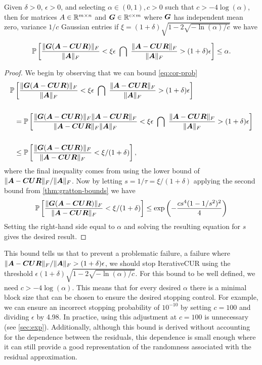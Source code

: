 \begin{corollary}
    Given  $\delta >0$, $\epsilon >0$, and selecting $\alpha\in(0,1), c>0$ such that $c>-4\log(\alpha)$, then for matrices $A \in \mathbb{R}^{m \times n}$ and $\boldsymbol{G} \in \mathbb{R}^{c \times m}$ where $\boldsymbol{G}$ has independent mean zero, variance $1 / c$ Gaussian entries if  $\xi =  (1+\delta)\sqrt{1-2\sqrt{-\ln(\alpha)/c}} $ we have 

   \begin{equation}\label{eq:cor-prob}
       \pr\left[\frac{\|\mat G(\mat A-\mat{CUR})\|_F}{\|\mat{A}\|_F} < \xi \epsilon \ \bigcap \ \frac{\|\mat A-\mat{CUR}\|_F}{\|\mat A\|_F} > (1+\delta)\epsilon \right] \leq \alpha.
   \end{equation}
\end{corollary}
\begin{proof}
We begin by observing that we can bound \cref{eq:cor-prob}
    \begin{align}
        \notag \pr&\left[\frac{\|\mat G(\mat A-\mat{CUR})\|_F}{\|\mat A\|_F} < \xi \epsilon \ \bigcap \ \frac{\|\mat A-\mat{CUR}\|_F}{\|\mat A\|_F} > (1+\delta)\epsilon \right]\\
        \notag \\
        & \notag =\pr\left[\frac{\|\mat G(\mat A-\mat{CUR})\|_F\|\mat A-\mat{CUR}\|_F}{\|\mat A-\mat{CUR}\|_F\|\mat A\|_F} < \xi \epsilon \ \bigcap\  \frac{\|\mat A-\mat{CUR}\|_F}{\|\mat A\|_F} > (1+\delta)\epsilon \right]\\
        \notag \\
        & \notag  \leq \pr\left[\frac{\|\mat G(\mat A-\mat{CUR})\|_F}{\|\mat A-\mat{CUR}\|_F} < \xi/(1+\delta)\right],
    \end{align}
    where the final inequality comes from using the lower bound of $\|\boldsymbol{A}-\boldsymbol{CUR}\|_F / \|\boldsymbol{A}\|_F$. Now by letting $s = 1/\tau = \xi/(1+\delta)$ 
    applying the second bound from \cref{thm:gratton-bounds} we have
    \begin{equation}
         \mathbb{P}\left[\frac{\|\boldsymbol{G}(\boldsymbol{A}-\boldsymbol{CUR})\|_F}{\|\boldsymbol{A}-\boldsymbol{CUR}\|_F} < \xi/(1+\delta)\right] \leq \exp\left( -\frac{cs^4 (1- 1/s ^2)^2}{4}\right)
    \end{equation}
    Setting the right-hand side equal to $\alpha$ and solving the resulting equation for $s$ gives the desired result.
\end{proof}
 This bound tells us that to prevent a problematic failure, a failure where $ \|\boldsymbol{A} - \boldsymbol{CUR}\|_F / \|\boldsymbol{A}\|_F> (1+\delta) \epsilon$, we should stop IterativeCUR using the threshold $\epsilon(1+\delta)\sqrt{1-2\sqrt{-\ln(\alpha)/c}}$. For this bound to be well defined, we need $c>-4\log(\alpha)$. This means that for every desired $\alpha$ there is a minimal block size that can be chosen to ensure the desired stopping control. For example, we can ensure an incorrect stopping probability of $10^{-10}$ by setting $c = 100$ and dividing $\epsilon$ by 4.98. In practice, using this adjustment at $c = 100$ is unnecessary (see \cref{sec:exp}). Additionally, although this bound is derived without accounting for the dependence between the residuals, this dependence is small enough where it can still provide a good representation of the randomness associated with the residual approximation.
    
